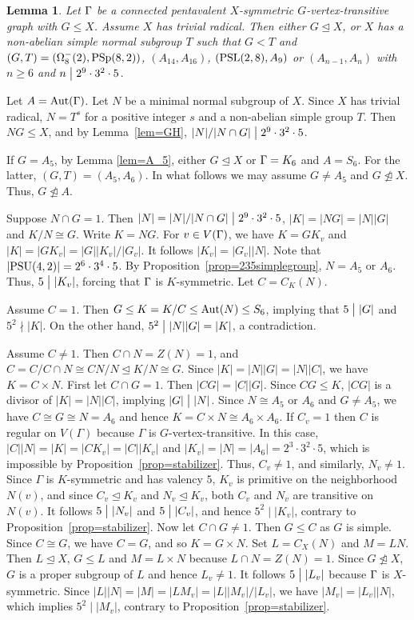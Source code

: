 \documentclass[12pt]{article}
\newtheorem{lem}{Lemma}[section]%
\def\di{\bigm|} \def\lg{\langle} \def\rg{\rangle}
\def\f{\noindent}
\def\PSL{\hbox{\rm PSL}}\def\PSU{\hbox{\rm PSU}}
\def\PSp{\hbox{\rm PSp}}\def\P\GammaL{\hbox{\rm P\Gamma L}} \def\ASIL{\hbox{\rm A\Sigma L}}
\def\Aut{\hbox{\rm Aut}}
\begin{document}
\begin{lem}\label{lem=insolvable2}
Let $\Gamma$ be a connected pentavalent $X$-symmetric $G$-vertex-transitive graph with $G\leq X$. Assume $X$ has trivial radical. Then either $G\unlhd X$, or $X$ has a non-abelian
simple normal subgroup $T$ such that $G<T$ and $(G,T)=(\Omega^-_8(2),\PSp(8,2))$, $(A_{14},A_{16})$, $(\PSL(2,8),A_{9})$ or $(A_{n-1},A_n)$ with $n\geq 6$ and $n\di 2^9\cdot3^2\cdot5$.
\end{lem}

\f {\bf Proof:} Let $A=\Aut(\G)$. Let $N$ be a minimal normal subgroup of $X$. Since $X$ has trivial radical,
$N=T^s$ for a positive integer $s$ and a non-abelian simple group $T$. Then $NG\leq X$, and by Lemma~\ref{lem=GH},
$|N|/|N\cap G|\di 2^9\cdot 3^2\cdot 5$.

If $G=A_5$, by Lemma \ref{lem=A_5}, either $G\unlhd X$ or $\Gamma=K_6$ and $A=S_6$. For the latter, $(G,T)=(A_5,A_6)$. In what follows we may assume $G\neq A_5$ and $G\ntrianglelefteq X$. Thus, $G\ntrianglelefteq A$.

Suppose $N \cap G =1$. Then $|N|=|N|/|N\cap G|\di 2^9\cdot 3^2\cdot 5$, $|K|=|NG|=|N||G|$ and $K/N\cong G$. Write $K=NG$. For $v\in V(\Gamma)$, we have $K=GK_v$ and $|K|=|GK_v|=|G||K_v|/|G_v|$. It follows $|K_v|=|G_v||N|$. Note that $|\PSU(4,2)|=2^6 \cdot3^4\cdot 5$. By Proposition~\ref{prop=235simplegroup}, $N=A_5$ or $A_6$.
Thus, $5\di |K_v|$, forcing that $\Gamma$ is $K$-symmetric. Let $C=C_K(N)$.

Assume $C=1$. Then $G\leq K=K/C \leq \Aut(N)\leq S_6$, implying that $5\di |G|$ and $5^2 \nmid |K|$. On the other hand,
$5^2 \di |N||G|=|K|$, a contradiction.

Assume $ C\neq 1$. Then $C\cap N=Z(N)=1$, and $C=C/C\cap N\cong CN/N \unlhd K/N \cong G$. Since $|K|=|N||G|=|N||C|$,
we have $K=C\times N$. First let $C\cap G=1$. Then $|CG|=|C||G|$. Since $CG\leq K$, $|CG|$ is a divisor of $|K|=|N||C|$, implying $|G|\di |N|$. Since $N\cong A_5$ or $A_6$ and $G \neq A_5$, we have $C\cong G\cong N=A_6$ and hence
$K=C\times N\cong A_6\times A_6$. If $C_v=1$ then $C$ is regular on $V(\Gamma)$ because $\Gamma$ is $G$-vertex-transitive.
In this case, $|C||N|=|K|=|CK_v|=|C||K_v|$ and $|K_v|=|N|=|A_6|=2^3\cdot 3^2\cdot 5$, which is impossible by Proposition~\ref{prop=stabilizer}. Thus, $C_v\not=1$, and similarly, $N_v\not=1$. Since $\Gamma$ is $K$-symmetric
and has valency $5$, $K_v$ is primitive on the neighborhood $N(v)$, and since $C_v\unlhd K_v$
and $N_v\unlhd K_v$, both $C_v$ and $N_v$ are transitive on $N(v)$. It follows $5\di |N_v|$ and $5\di |C_v|$,
and hence $5^2\mid |K_v|$, contrary to Proposition~\ref{prop=stabilizer}. Now let $C\cap G\not=1$.
Then $G\leq C$ as $G$ is simple. Since $C\cong G$, we have $C=G$, and so $K=G\times N$. Set $L=C_X(N)$ and $M=LN$.
Then $L\unlhd X$, $G\leq L$ and $M=L\times N$ because $L\cap N=Z(N)=1$. Since $G\ntrianglelefteq X$,
$G$ is a proper subgroup of $L$ and hence $L_v\not=1$. It follows $5\di |L_v|$ because $\Gamma$ is $X$-symmetric.
Since $|L||N|=|M|=|LM_v|=|L||M_v|/|L_v|$, we have $|M_v|=|L_v||N|$, which implies $5^2\mid |M_v|$,
contrary to Proposition~\ref{prop=stabilizer}.
\end{document}
